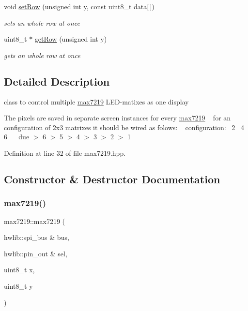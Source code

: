 \begin{DoxyCompactItemize}
void \mbox{\hyperlink{classmax7219_a87ca725fb912b4f6c4093bc29d89046b}{set\+Row}} (unsigned int y, const uint8\+\_\+t data\mbox{[}$\,$\mbox{]})
\begin{DoxyCompactList}\small\item\em sets an whole row at once \end{DoxyCompactList}\item 
uint8\+\_\+t $\ast$ \mbox{\hyperlink{classmax7219_a0f9339f854dea8c0499dbfc4785fc9e2}{get\+Row}} (unsigned int y)
\begin{DoxyCompactList}\small\item\em gets an whole row at once \end{DoxyCompactList}\end{DoxyCompactItemize}


\subsection{Detailed Description}
class to control multiple \mbox{\hyperlink{classmax7219}{max7219}} L\+E\+D-\/matixes as one display 

The pixels are saved in separate screen instances for every \mbox{\hyperlink{classmax7219}{max7219}} ~\newline
for an configuration of 2x3 matrixes it should be wired as folows\+: ~\newline
configuration\+:~ 2~ 4~ 6~\newline
~\newline
due $>$ 6 $>$ 5 $>$ 4 $>$ 3 $>$ 2 $>$ 1 

Definition at line 32 of file max7219.\+hpp.



\subsection{Constructor \& Destructor Documentation}
\mbox{\label{classmax7219_a892f1c436090d79718d264e3f8fe0029}} 
\subsubsection{\texorpdfstring{max7219()}{max7219()}}
{\footnotesize\ttfamily max7219\+::max7219 (\begin{DoxyParamCaption}\item[{hwlib\+::spi\+\_\+bus \&}]{bus,  }\item[{hwlib\+::pin\+\_\+out \&}]{sel,  }\item[{uint8\+\_\+t}]{x,  }\item[{uint8\+\_\+t}]{y }\end{DoxyParamCaption})\hspace{0.3cm}{\ttfamily [inline]}}



